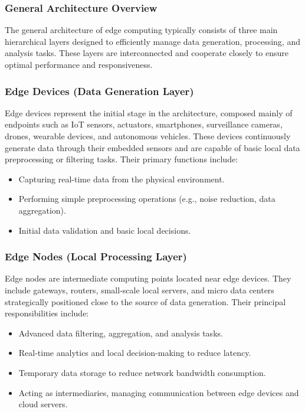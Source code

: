 \documentclass[runningheads]{llncs}
\begin{document}
\subsubsection{General Architecture Overview}
The general architecture of edge computing typically consists of three main hierarchical layers designed to efficiently manage data generation, processing, and analysis tasks. These layers are interconnected and cooperate closely to ensure optimal performance and responsiveness.

\subsubsection{Edge Devices (Data Generation Layer)}
Edge devices represent the initial stage in the architecture, composed mainly of endpoints such as IoT sensors, actuators, smartphones, surveillance cameras, drones, wearable devices, and autonomous vehicles. These devices continuously generate data through their embedded sensors and are capable of basic local data preprocessing or filtering tasks. Their primary functions include:
\begin{itemize}
    \item Capturing real-time data from the physical environment.
    \item Performing simple preprocessing operations (e.g., noise reduction, data aggregation).
    \item Initial data validation and basic local decisions.
\end{itemize}

\subsubsection{Edge Nodes (Local Processing Layer)}
Edge nodes are intermediate computing points located near edge devices. They include gateways, routers, small-scale local servers, and micro data centers strategically positioned close to the source of data generation. Their principal responsibilities include:
\begin{itemize}
    \item Advanced data filtering, aggregation, and analysis tasks.
    \item Real-time analytics and local decision-making to reduce latency.
    \item Temporary data storage to reduce network bandwidth consumption.
    \item Acting as intermediaries, managing communication between edge devices and cloud servers.
\end{itemize}
\end{document}
